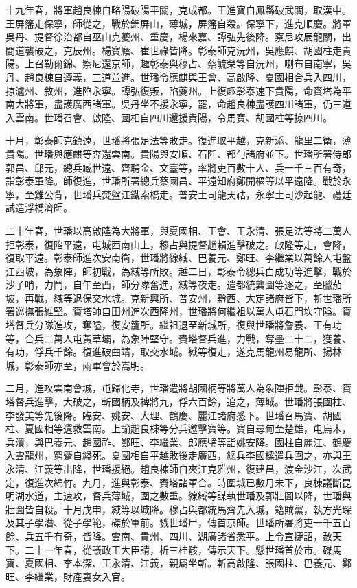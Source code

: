 \begin{pinyinscope}
十九年春，將軍趙良棟自略陽破陽平關，克成都。王進寶自鳳縣破武關，取漢中。王屏籓走保寧，師從之，戰於錦屏山，薄城，屏籓自殺。保寧下，進克順慶。將軍吳丹、提督徐治都自巫山克夔州、重慶，楊來嘉、譚弘先後降。察尼攻辰龍關，出間道襲破之，克辰州。楊寶廕、崔世祿皆降。彰泰師克沅州，吳應麒、胡國柱走貴陽。上召勒爾錦、察尼還京師，趣彰泰與穆占、蔡毓榮等自沅州，喇布自南寧，吳丹、趙良棟自遵義，三道並進。世璠令應麒與王會、高啟隆、夏國相合兵入四川，掠瀘州、敘州，進陷永寧。譚弘復叛，陷夔州。上復趣彰泰速下貴陽，命賚塔為平南大將軍，盡護廣西諸軍。吳丹坐不援永寧，罷，命趙良棟盡護四川諸軍，仍三道入雲南。世璠召會、啟隆、國相自四川還援貴陽，令馬寶、胡國柱等掠四川。

十月，彰泰師克鎮遠，世璠將張足法等敗走。復進取平越，克新添、龍里二衛，薄貴陽。世璠與應麒等奔還雲南。貴陽與安順、石阡、都勻諸府並下。世璠所署侍郎郭昌、邱元，總兵臧世遠、齊聘金、文臺等，率將吏百數十人、兵一千三百有奇，詣彰泰軍降。師復進，世璠所署總兵蔡國昌、平遠知府鄭開樞等以平遠降。戰於永寧，至雞公背，世璠兵焚盤江鐵索橋走。普安土司龍天祜，永寧土司沙起龍、禮廷試造浮橋濟師。

二十年春，世璠以高啟隆為大將軍，與夏國相、王會、王永清、張足法等將二萬人拒彰泰，復陷平遠，屯城西南山上，穆占與提督趙賴進擊破之。啟隆等走，會降，復取平遠。彰泰師進次安南衛，世璠將線緎、巴養元、鄭旺、李繼業以萬餘人屯盤江西坡，為象陣，師初戰，為緎等所敗。越二日，彰泰令總兵白成功等進擊，戰於沙子哨，力鬥，自午至酉，師分隊奮進，緎等夜走。遣都統龔圖等逐之，至臘茄坡，再戰，緎等退保交水城。克新興所、普安州，黔西、大定諸府皆下，斬世璠所署巡撫張維堅。賚塔師自田州進次西隆州，世璠將何繼祖以萬人屯石門坎守隘。賚塔督兵分隊進攻，奪隘，復安籠所。繼祖退至新城所，復與世璠將詹養、王有功等，合兵二萬人屯黃草壩，為象陣堅守。賚塔督兵進，力戰，奪壘二十二，獲養、有功，俘兵千餘。復進破曲靖，取交水城。緎等復走，遂克馬龍州易龍所、揚林城，彰泰師亦至，兩軍會於嵩明。

二月，進攻雲南會城，屯歸化寺，世璠遣將胡國柄等將萬人為象陣拒戰。彰泰、賚塔督兵進擊，大破之，斬國柄及裨將九，俘六百餘，追之，薄城。世璠將張國柱、李發美等先後降。臨安、姚安、大理、鶴慶、麗江諸府悉下。世璠召馬寶、胡國柱、夏國相等還救雲南。上諭趙良棟等分兵邀擊寶等。寶自尋甸至楚雄，屯烏木，兵潰，與巴養元、趙國祚、鄭旺、李繼業、郎應璧等詣姚安降。國柱自麗江、鶴慶入雲龍州，窮蹙自縊死。夏國相自平越敗後走廣西，總兵李國樑遣兵圍之，亦與王永清、江義等出降，世璠援絕。趙良棟師自夾江克雅州，復建昌，渡金沙江，次武定，復進次綿竹。九月，進與彰泰、賚塔諸軍合。時圍城已數月未下，良棟議斷昆明湖水道，主速攻，督兵薄城，圍之數重。線緎等謀執世璠及郭壯圖以降，世璠與壯圖皆自殺。十月戊申，緎等以城降。穆占與都統馬齊先入城，籍賊黨，執方光琛及其子學潛、從子學範，磔於軍前。戮世璠尸，傳首京師。世璠所署將吏一千五百餘、兵五千有奇，皆降。雲南、貴州、四川、湖廣諸省悉平。上令宣捷詔，赦天下。二十一年春，從議政王大臣請，析三桂骸，傳示天下。懸世璠首於市。磔馬寶、夏國相、李本深、王永清、江義，親屬坐斬。斬高啟隆、張國柱、巴養元、鄭旺、李繼業，財產妻女入官。


\end{pinyinscope}
